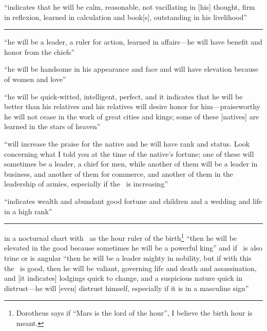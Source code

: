 \begin{description}[style=multiline,leftmargin=2.5cm]
\item[\Saturn\Trine\Mercury] ``indicates that he will be calm, reasonable, not vacillating in [his] thought, firm in reflexion, learned in calculation and book[s], outstanding in his livelihood''

\vspace{0.5em}\hrule

\item[\Jupiter\Trine\Mars] ``he will be a leader, a ruler for action, learned in affairs---he will have benefit and honor from the chiefs''

\item[\Jupiter\Trine\Venus] ``he will be handsome in his appearance and face and will have elevation because of women and love''

\item[\Jupiter\Trine\Mercury] ``he will be quick-witted, intelligent, perfect, and it indicates that he will be better than his relatives and his relatives will desire honor for him---praiseworthy he will not cease in the work of great cities and kings; some of these [natives] are learned in the stars of heaven''

\item[\Jupiter\Trine\Moon] ``will increase the praise for the native and he will have rank and status. Look concerning what I told you at the time of the native's fortune; one of these will sometimes be a leader, a chief for men, while another of them will be a leader in business, and another of them for commerce, and another of them in the leadership of armies, especially if the \Moon\, is increasing''

\item[\Jupiter\Trine\Sun] ``indicates wealth and abundant good fortune and children and a wedding and life in a high rank''

\vspace{0.5em}\hrule

\item[\Mars\Trine\Sun] in a nocturnal chart with \Mars\, as the hour ruler of the birth\footnote{Dorotheus says if ``Mars is the lord of the hour'', I believe the birth hour is meant.} ``then he will be elevated in the good because sometimes he will be a powerful king'' and if \Jupiter\, is also trine or is angular ``then he will be a leader mighty in nobility, but if with this the \Moon\, is good, then he will be valiant, governing life and death and assassination, and [it indicates] lodgings quick to change, and a suspicious nature quick in distrust---he will [even] distrust himself, especially if it is in  a masculine sign''


\end{description}
